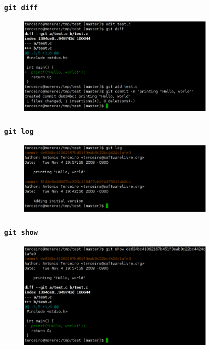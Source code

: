 \documentclass{beamer}
\begin{document}
\begin{frame}
  \frametitle{\texttt{git diff}}
  \begin{figure}[h]
    \begin{center}
      \includegraphics[width=0.85\textwidth]{figs/git-screenshot-diff.pdf}
    \end{center}
    \label{fig:git-diff}
  \end{figure}
\end{frame}

\begin{frame}
  \frametitle{\texttt{git log}}
  \begin{figure}[h]
    \begin{center}
      \includegraphics[width=0.85\textwidth]{figs/git-screenshot-log.pdf}
    \end{center}
    \label{fig:git-log}
  \end{figure}
\end{frame}

\begin{frame}
  \frametitle{\texttt{git show}}
  \begin{figure}[h]
    \begin{center}
      \includegraphics[width=0.85\textwidth]{figs/git-screenshot-show.pdf}
    \end{center}
    \label{fig:git-show}
  \end{figure}
\end{frame}
\end{document}
